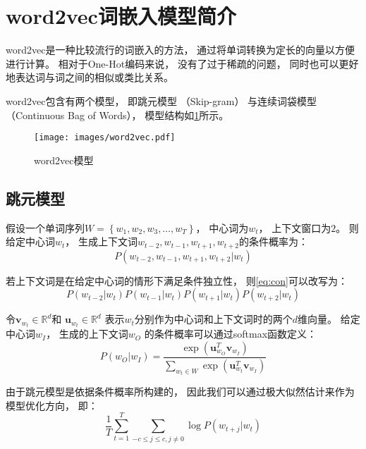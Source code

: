 \section{word2vec词嵌入模型简介}

word2vec是一种比较流行的词嵌入的方法，
通过将单词转换为定长的向量以方便进行计算。
相对于One-Hot编码来说，
没有了过于稀疏的问题，
同时也可以更好地表达词与词之间的相似或类比关系。

word2vec包含有两个模型，
即跳元模型\cite{mikolovDistributedRepresentationsWords2013}
（Skip-gram）
与连续词袋模型\cite{mikolovEfficientEstimationWord2013}
（Continuous Bag of Words），
模型结构如\cref{fig:word2vec}所示。

\begin{figure}[!htbp]
    \centering
    \texttt{[image: images/word2vec.pdf]}
    \caption{word2vec模型}
    \label{fig:word2vec}
\end{figure}

\subsection{跳元模型}

假设一个单词序列$W = \left\{w_1, w_2, w_3, \ldots, w_T\right\}$，
中心词为$w_t$，
上下文窗口为$2$。
则给定中心词$w_t$，
生成上下文词$w_{t-2}, w_{t-1}, w_{t+1}, w_{t+2}$的条件概率为：
\begin{equation}
    \label{eq:con}
    P(w_{t-2}, w_{t-1}, w_{t+1}, w_{t+2}|w_t)
\end{equation}

若上下文词是在给定中心词的情形下满足条件独立性，
则\cref{eq:con}可以改写为：
\begin{equation}
    P(w_{t-2}|w_t)P(w_{t-1}|w_t)P(w_{t+1}|w_t)P(w_{t+2}|w_t)
\end{equation}

令$\mathbf{v}_{w_t}\in\mathbb{R}^d$和
$\mathbf{u}_{w_t}\in\mathbb{R}^d$
表示$w_t$分别作为中心词和上下文词时的两个$d$维向量。
给定中心词$w_I$，
生成的上下文词$w_O$
的条件概率可以通过softmax函数定义：
\begin{equation}
    P\left(w_O|w_I\right) = \frac{\exp\left(\mathbf{u}_{w_O}^T\mathbf{v}_{w_I}\right)}{\sum_{w_t\in W}\exp\left(\mathbf{u}_{w_t}^T\mathbf{v}_{w_I}\right)}
\end{equation}

由于跳元模型是依据条件概率所构建的，
因此我们可以通过极大似然估计来作为模型优化方向，
即：
\begin{equation}
    \frac{1}{T}\sum^T_{t=1}\sum_{-c\leqslant j\leqslant c, j\neq 0}\log P\left(w_{t+j}|w_t\right)
\end{equation}

